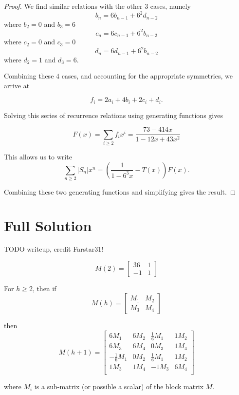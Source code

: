 \documentclass[12pt]{article}
\theoremstyle{plain}
\theoremstyle{definition}
\theoremstyle{remark}
\theoremstyle{definition}
\begin{document}
\begin{proof}
We find similar relations with the other $3$ cases, namely
$$b_n = 6b_{n-1} + 6^2 d_{n-2}$$
where $b_2 = 0$ and $b_3 = 6$
$$c_n = 6c_{n-1} + 6^2 b_{n-2}$$
where $c_2 = 0$ and $c_3 = 0$
$$d_n = 6d_{n-1} + 6^2 b_{n-2}$$
where $d_2 = 1$ and $d_3 = 6.$

Combining these $4$ cases, and accounting for the appropriate symmetries, we arrive at

$$f_i = 2a_i + 4b_i + 2c_i + d_i.$$

Solving this series of recurrence relations using generating functions gives

$$F(x) = \sum_{i \geq 2} f_i x^i = \frac{73 - 414x}{1-12x+43x^2}$$

This allows us to write 
$$\sum_{n \geq 2} |S_n|x^n = \left(\frac{1}{1-6^3x}-T(x)\right)F(x).$$

Combining these two generating functions and simplifying gives the result.

\end{proof}

\section{Full Solution}

TODO writeup, credit Farstar31!

$$
M(2) = \begin{bmatrix}
36 & 1 \\
-1 & 1
\end{bmatrix}
$$

For $h \geq 2$, then if
$$
M(h) = \begin{bmatrix}
M_1 & M_2 \\
M_3 & M_4
\end{bmatrix}
$$

then
$$
M(h+1) = \begin{bmatrix}
6M_1 & 6M_2 & \frac{1}{6}M_1 & 1M_2 \\
6M_3 & 6M_4 & 0M_3 & 1M_4 \\
-\frac{1}{6}M_1 & 0M_2 & \frac{1}{6}M_1 & 1M_2 \\
1M_3 & 1M_4 & -1M_3 & 6M_4 \\
\end{bmatrix}
$$

where $M_i$ is a sub-matrix (or possible a scalar) of the block matrix $M$.
\end{document}

